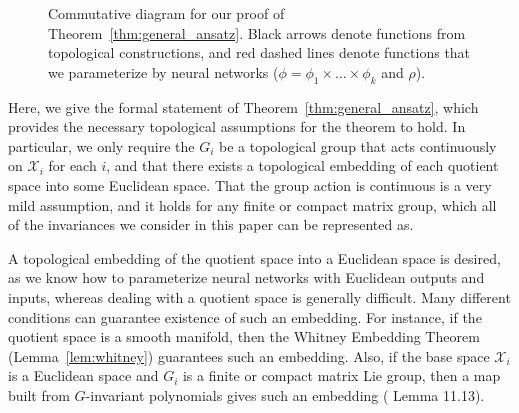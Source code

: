 \documentclass{article} \usepackage{iclr2023_conference,times}
\newcommand{\RR}{\mathbb R}
\newcommand{\mc}[1]{\mathcal{#1}}
\newcommand{\mrm}[1]{\mathrm{#1}}
\newcommand{\dout}{d_{\mrm{out}}}
\begin{document}
\begin{figure}[ht]
    \centering
    \caption{Commutative diagram for our proof of Theorem~\ref{thm:general_ansatz}. Black arrows denote functions from topological constructions, and red dashed lines denote functions that we parameterize by neural networks ($\phi = \phi_1 \times \ldots \times \phi_k$ and $\rho$).}
    \label{fig:cd_general_ansatz}
\end{figure}


Here, we give the formal statement of Theorem~\ref{thm:general_ansatz}, which provides the necessary topological assumptions for the theorem to hold. In particular, we only require the $G_i$ be a topological group that acts continuously on $\mc X_i$ for each $i$, and that there exists a topological embedding of each quotient space into some Euclidean space. That the group action is continuous is a very mild assumption, and it holds for any finite or compact matrix group, which all of the invariances we consider in this paper can be represented as.

A topological embedding of the quotient space into a Euclidean space is desired, as we know how to parameterize neural networks with Euclidean outputs and inputs, whereas dealing with a quotient space is generally difficult. Many different conditions can guarantee existence of such an embedding.
For instance, if the quotient space is a smooth manifold, then the Whitney Embedding Theorem (Lemma~\ref{lem:whitney}) guarantees such an embedding. Also, if the base space $\mc X_i$ is a Euclidean space and $G_i$ is a finite or compact matrix Lie group, then a map built from $G$-invariant polynomials gives such an embedding (\cite{gonzalez2003c} Lemma 11.13).
\end{document}
